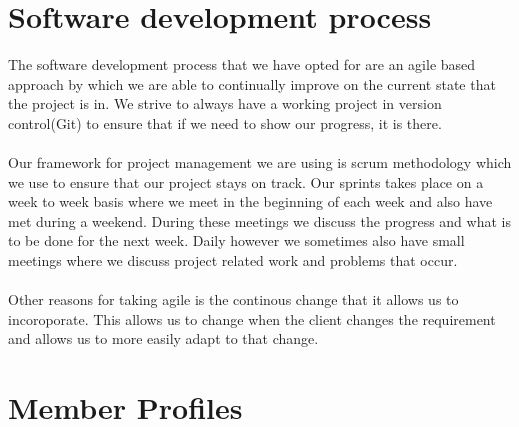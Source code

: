 \documentclass[a4paper,12pt,final]{article}
\begin{document}
\section{Software development process}
The software development process that we have opted for are an 
agile based approach by which we are able to continually improve 
on the current state that the project is in. We strive to always have
a working project in version control(Git) to ensure that if we need to
show our progress, it is there.\\
\textbf{\\}
Our framework for project management we are using is scrum methodology 
which we use to ensure that our project stays on track. Our sprints takes
place on a week to week basis where we meet in the beginning of each week
and also have met during a weekend. During these meetings we discuss the
progress and what is to be done for the next week. Daily however we sometimes
also have small meetings where we discuss project related work and problems that
occur.\\
\textbf{\\}
Other reasons for taking agile is the continous change that it allows us to 
incoroporate. This allows us to change when the client changes the requirement
and allows us to more easily adapt to that change.


\section{Member Profiles}
\end{document}
